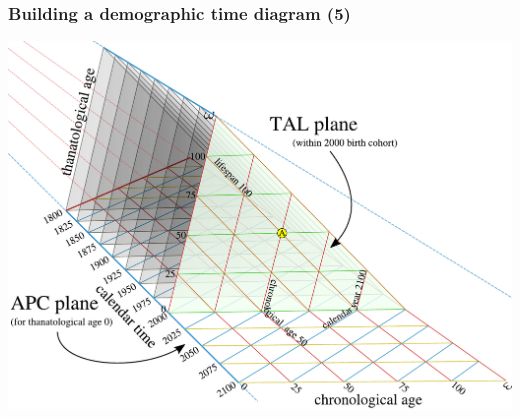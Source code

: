 \documentclass[20pt]{beamer}
\begin{document}
\begin{frame}
\frametitle{Building a demographic time diagram (5)}
\vspace{-1em}
\begin{center}
\includegraphics[scale=.8]{Figures/buildTAL5.pdf}
\end{center}
\end{frame}
\end{document}
